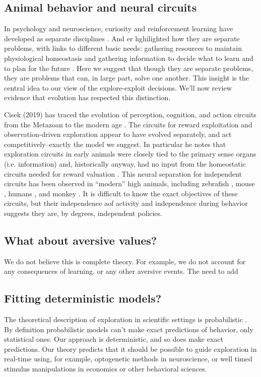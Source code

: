\subsection*{Animal behavior and neural circuits}
In psychology and neuroscience, curiosity and reinforcement learning have developed as separate disciplines \cite{Berlyne1950,Kidd2015,Sutton2018}. And er hghilighted how they are separate problems, with links to different basic needs: gathering resources to maintain physiological homeostasis \cite{Keramati2014,Juechems2019} and gathering information to decide what to learn and to plan for the future \cite{Valiant1984,Sutton2018}. Here we suggest that though they are separate problems, they are problems that can, in large part, solve one another. This insight is the central idea to our view of the explore-exploit decisions. We'll now review evidence that evolution has respected this distinction. 

Cisek (2019) has traced the evolution of perception, cognition, and action circuits from the Metazoan to the modern age \cite{Cisek2019}. The circuits for reward exploitation and observation-driven exploration appear to have evolved separately, and act competitively--exactly the model we suggest. In particular he notes that exploration circuits in early animals were closely tied to the primary sense organs (i.e. information) and, historically anyway, had no input from the homeostatic circuits needed for reward valuation \cite{Keramati2014,Cisek2019,Juechems2019}. This neural separation for independent circuits has been observed in ``modern'' high animals, including zebrafish \cite{needed}, mouse \cite{needed}, humans \cite{needed}, and monkey \cite{White2019,Wang2019}. It is difficult to know the exact objectives of these circuits, but their independence aof activity and independence during behavior suggests they are, by degrees, independent policies.


\subsection*{What about aversive values?}
We do not believe this is complete theory. For example, we do not account for any consequences of learning, or any other aversive events. The need to add 


\subsection*{Fitting deterministic models?}
The theoretical description of exploration in scientific settings is probabilistic \cite{Calhoun2014,Song2019a,Gershman2018b,Schulz2018a}. By definition probabilistic models can't make exact predictions of behavior, only statistical ones. Our approach is deterministic, and so does make exact predictions. Our theory predicts that it should be possible to guide exploration in real-time using, for example, optogenetic methods in neuroscience, or well timed stimulus manipulations in economics or other behavioral sciences. 

